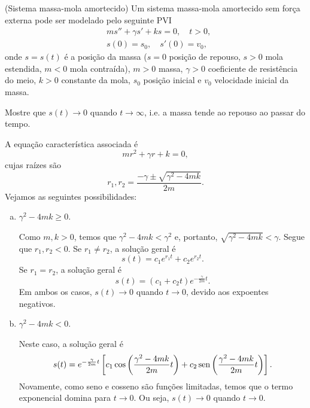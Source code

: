 \begin{exeresol}(Sistema massa-mola amortecido)
  Um sistema massa-mola amortecido sem força externa pode ser modelado pelo seguinte PVI
  \begin{align}
    & ms'' + \gamma s' + ks = 0,\quad t>0,\\
    & s(0) = s_0,\quad s'(0) = v_0,
  \end{align}
  onde $s = s(t)$ é a posição da massa ($s=0$ posição de repouso, $s>0$ mola estendida, $m<0$ mola contraída), $m>0$ massa, $\gamma>0$ coeficiente de resistência do meio, $k>0$ constante da mola, $s_0$ posição inicial e $v_0$ velocidade inicial da massa.

  Mostre que $s(t)\to 0$ quando $t\to\infty$, i.e. a massa tende ao repouso ao passar do tempo.
\end{exeresol}
\begin{resol}
  A equação característica associada é
  \begin{equation}
    mr^2 + \gamma r + k = 0,
  \end{equation}
  cujas raízes são
  \begin{equation}
    r_1, r_2 = \frac{-\gamma \pm\sqrt{\gamma^2 - 4mk}}{2m}.
  \end{equation}
  Vejamos as seguintes possibilidades:
  \begin{enumerate}[a)]
  \item $\gamma^2 - 4mk\geq 0$.

    Como $m,k>0$, temos que $\gamma^2-4mk < \gamma^2$ e, portanto, $\sqrt{\gamma^2 - 4mk} < \gamma$. Segue que $r_1, r_2 < 0$. Se $r_1 \neq r_2$, a solução geral é
    \begin{equation}
      s(t) = c_1e^{r_1t} + c_2e^{r_2t}.
    \end{equation}
    Se $r_1=r_2$, a solução geral é
    \begin{equation}
      s(t) = (c_1 + c_2t)e^{-\frac{\gamma}{2m}t}.
    \end{equation}
    Em ambos os casos, $s(t)\to 0$ quando $t\to 0$, devido aos expoentes negativos.

  \item $\gamma^2 -4mk < 0$.

    Neste caso, a solução geral é
    \begin{equation}
      s(t) = e^{-\frac{\gamma}{2m}t}\left[c_1\cos\left(\frac{\gamma^2-4mk}{2m}t\right) + c_2\operatorname{sen}\left(\frac{\gamma^2-4mk}{2m}t\right)\right].
    \end{equation}
    Novamente, como seno e cosseno são funções limitadas, temos que o termo exponencial domina para $t\to 0$. Ou seja, $s(t)\to 0$ quando $t\to 0$.
  \end{enumerate}
\end{resol}

